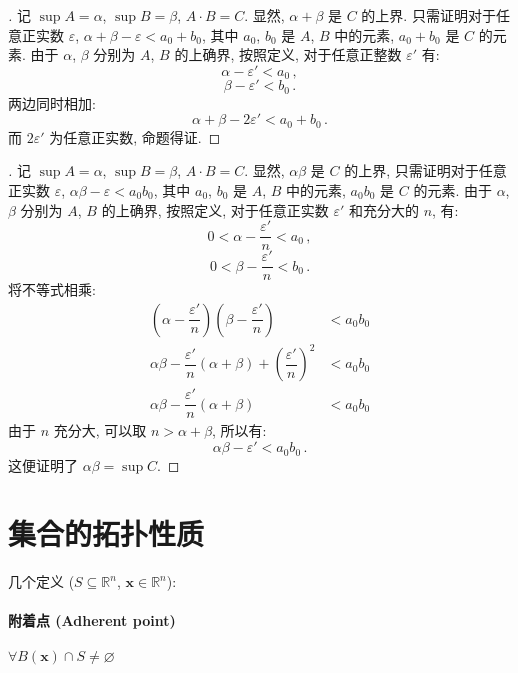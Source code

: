 \documentclass[UTF8]{ctexart}
\theoremstyle{mystyle}
\newcommand{\ve}[1]{\boldsymbol{\mathbf{#1}}}
\newcommand{\R}{\mathbb R}
\renewcommand{\epsilon}{\varepsilon}
\begin{document}
\begin{proof}[]
    记 $ \sup A = \alpha $, $ \sup B = \beta $, $ A \cdot B = C $. 显然, $ \alpha + \beta $ 是 $ C $ 的上界. 只需证明对于任意正实数 $ \epsilon $, $ \alpha + \beta - \epsilon < a_0 + b_0 $, 其中 $ a_0 $, $ b_0 $ 是 $ A $, $ B $ 中的元素, $ a_0 + b_0 $ 是 $ C $ 的元素. 由于 $ \alpha $, $ \beta $ 分别为 $ A $, $ B $ 的上确界, 按照定义, 对于任意正整数 $ \epsilon' $ 有:
    \[ \alpha - \epsilon' < a_0 \,,\]
    \[ \beta - \epsilon' < b_0 \,.\]
    两边同时相加:
    \[ \alpha + \beta - 2\epsilon' < a_0 + b_0 \,.\]
    而 $ 2\epsilon' $ 为任意正实数, 命题得证.
\end{proof}

\begin{proof}[]
    记 $ \sup A = \alpha $, $ \sup B = \beta $, $ A \cdot B = C $. 显然, $ \alpha \beta $ 是 $ C $ 的上界, 只需证明对于任意正实数 $ \epsilon $, $ \alpha \beta - \epsilon < a_0 b_0 $, 其中 $ a_0 $, $ b_0 $ 是 $ A $, $ B $ 中的元素, $ a_0 b_0 $ 是 $ C $ 的元素. 由于 $ \alpha $, $ \beta $ 分别为 $ A $, $ B $ 的上确界, 按照定义, 对于任意正实数 $ \epsilon' $ 和充分大的 $ n $, 有:
    \[ 0 < \alpha - \dfrac{\epsilon'}{n} < a_0 \,,\]
    \[ 0 < \beta - \dfrac{\epsilon'}{n} < b_0 \,.\]
    将不等式相乘:
    \begin{align*}
        \left( \alpha - \dfrac{\epsilon'}{n} \right) \left( \beta - \dfrac{\epsilon'}{n} \right) &< a_0 b_0 \\
        \alpha \beta - \dfrac{\epsilon'}{n}(\alpha + \beta) + \left( \dfrac{\epsilon'}{n} \right)^2 &< a_0 b_0 \\
        \alpha \beta - \dfrac{\epsilon'}{n} (\alpha + \beta) &< a_0 b_0
    \end{align*}
    由于 $ n $ 充分大, 可以取 $ n > \alpha + \beta $, 所以有:
    \[ \alpha \beta - \epsilon' < a_0 b_0 \,.\]
    这便证明了 $ \alpha \beta = \sup C $.
\end{proof}


\section{集合的拓扑性质}
几个定义 ($ S \subseteq \R^n $, $ \ve x \in \R^n $):

\paragraph{附着点 (Adherent point)}
$ \forall B(\ve x) \cap S \neq \varnothing $
\end{document}
